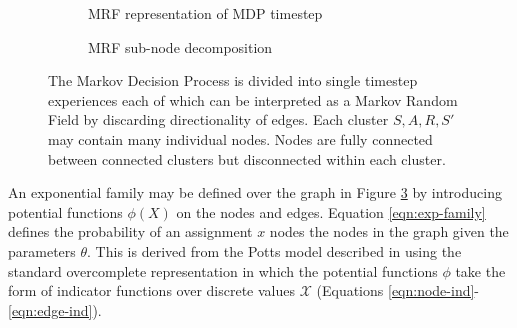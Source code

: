 \documentclass{article} %
\begin{document}
\begin{figure}
  \centering
  \begin{subfigure}[b]{0.4\textwidth}
    \centering
    \caption{MRF representation of MDP timestep}
    \label{fig:mrf}
  \end{subfigure}
  \begin{subfigure}[b]{0.5\textwidth}
    \centering
    \caption{MRF sub-node decomposition}
    \label{fig:decomp}
  \end{subfigure}
  \caption{The Markov Decision Process is divided into single timestep experiences each of which can be interpreted as a Markov Random Field by discarding directionality of edges. Each cluster $S,A,R,S'$ may contain many individual nodes. Nodes are fully connected between connected clusters but disconnected within each cluster.}
  \label{fig:structure}
\end{figure}

An exponential family may be defined over the graph in Figure \ref{fig:structure} by introducing potential functions $\phi(X)$ on the nodes and edges. Equation \ref{eqn:exp-family} defines the probability of an assignment $x$ nodes the nodes in the graph given the parameters $\theta$. This is derived from the Potts model described in \cite{wainwright08} using the standard overcomplete representation in which the potential functions $\phi$ take the form of indicator functions over discrete values $\mathcal{X}$ (Equations \ref{eqn:node-ind}-\ref{eqn:edge-ind}).
\end{document}
